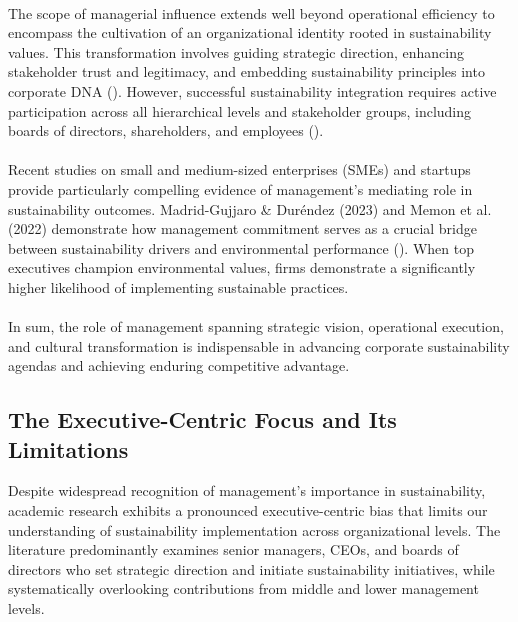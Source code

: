 	\paragraph*{} The scope of managerial influence extends well beyond operational efficiency to encompass the cultivation of an organizational identity rooted in sustainability values. This transformation involves guiding strategic direction, enhancing stakeholder trust and legitimacy, and embedding sustainability principles into corporate DNA (\textcite{Eccles2014, Dyllick2016}). However, successful sustainability integration requires active participation across all hierarchical levels and stakeholder groups, including boards of directors, shareholders, and employees (\textcite{Freeman1984}).
	
	\paragraph*{} Recent studies on small and medium-sized enterprises (SMEs) and startups provide particularly compelling evidence of management’s mediating role in sustainability outcomes. Madrid-Gujjaro \& Duréndez (2023) and Memon et al. (2022) demonstrate how management commitment serves as a crucial bridge between sustainability drivers and environmental performance (\textcite{Madrid2023, Memon2022}). When top executives champion environmental values, firms demonstrate a significantly higher likelihood of implementing sustainable practices.
	
	\paragraph*{} In sum, the role of management spanning strategic vision, operational execution, and cultural transformation is indispensable in advancing corporate sustainability agendas and achieving enduring competitive advantage.
	
	\subsection{The Executive-Centric Focus and Its Limitations}
	Despite widespread recognition of management’s importance in sustainability, academic research exhibits a pronounced executive-centric bias that limits our understanding of sustainability implementation across organizational levels. The literature predominantly examines senior managers, CEOs, and boards of directors who set strategic direction and initiate sustainability initiatives, while systematically overlooking contributions from middle and lower management levels.
	
